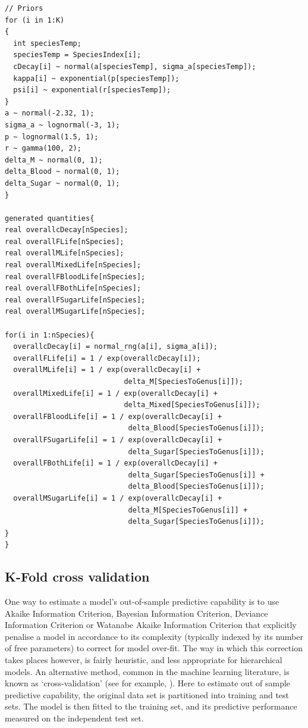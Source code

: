 \documentclass[12pt]{article}
\begin{document}
\begin{verbatim}
// Priors
for (i in 1:K)
{
  int speciesTemp;
  speciesTemp = SpeciesIndex[i];
  cDecay[i] ~ normal(a[speciesTemp], sigma_a[speciesTemp]);
  kappa[i] ~ exponential(p[speciesTemp]);  
  psi[i] ~ exponential(r[speciesTemp]);
}
a ~ normal(-2.32, 1);
sigma_a ~ lognormal(-3, 1);
p ~ lognormal(1.5, 1);
r ~ gamma(100, 2);
delta_M ~ normal(0, 1);
delta_Blood ~ normal(0, 1);
delta_Sugar ~ normal(0, 1);
}

generated quantities{
real overallcDecay[nSpecies];
real overallFLife[nSpecies];
real overallMLife[nSpecies];
real overallMixedLife[nSpecies];
real overallFBloodLife[nSpecies];
real overallFBothLife[nSpecies];
real overallFSugarLife[nSpecies];
real overallMSugarLife[nSpecies];

for(i in 1:nSpecies){
  overallcDecay[i] = normal_rng(a[i], sigma_a[i]);
  overallFLife[i] = 1 / exp(overallcDecay[i]);
  overallMLife[i] = 1 / exp(overallcDecay[i] +
                            delta_M[SpeciesToGenus[i]]);
  overallMixedLife[i] = 1 / exp(overallcDecay[i] +
                            delta_Mixed[SpeciesToGenus[i]]);
  overallFBloodLife[i] = 1 / exp(overallcDecay[i] +
                             delta_Blood[SpeciesToGenus[i]]);
  overallFSugarLife[i] = 1 / exp(overallcDecay[i] +
                             delta_Sugar[SpeciesToGenus[i]]);
  overallFBothLife[i] = 1 / exp(overallcDecay[i] +
                             delta_Sugar[SpeciesToGenus[i]] +
                             delta_Blood[SpeciesToGenus[i]]);
  overallMSugarLife[i] = 1 / exp(overallcDecay[i] +
                             delta_M[SpeciesToGenus[i]] +
                             delta_Sugar[SpeciesToGenus[i]]);
}
}
\end{verbatim}

\subsection{K-Fold cross validation}\label{sec:mrr_kFold}
One way to estimate a model's out-of-sample predictive capability is to use Akaike Information Criterion, Bayesian Information Criterion, Deviance Information Criterion or Watanabe Akaike Information Criterion that explicitly penalise a model in accordance to its complexity (typically indexed by its number of free parameters) to correct for model over-fit. The way in which this correction takes places however, is fairly heuristic, and less appropriate for hierarchical models. An alternative method, common in the machine learning literature, is known as `cross-validation' (see for example, \cite{kohavi1995study}). Here to estimate out of sample predictive capability, the original data set is partitioned into training and test sets. The model is then fitted to the training set, and its predictive performance measured on the independent test set.
\end{document}
